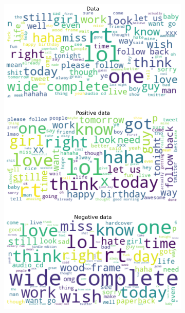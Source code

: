 \documentclass{article}
\begin{document}
\begin{itemize}
\begin{figure}[H]
\begin{subfigure}[b]{0.24\textwidth}
\includegraphics[width=\textwidth]{chapter-06/section-01-01/11/visualization/3/wordcloud.png}
\end{subfigure}
\begin{subfigure}[b]{0.24\textwidth}
\centering

\end{subfigure}
\end{figure}
\end{itemize}
\end{document}
